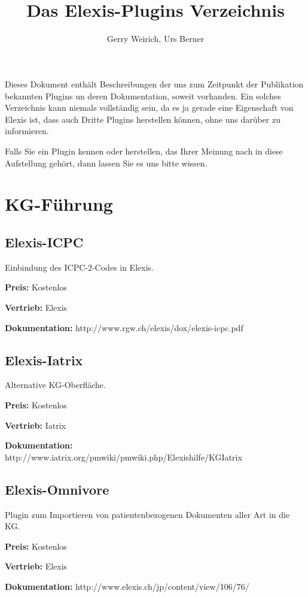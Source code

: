\documentclass[paper=a4,BCOR8.25mm]{scrartcl}
\author{Gerry Weirich, Urs Berner}
\title{Das Elexis\textsuperscript{\textregistered}-Plugins Verzeichnis}
\begin{document}
\maketitle

\tableofcontents


Dieses Dokument enthält Beschreibungen der uns zum Zeitpunkt der Publikation bekannten Plugins un deren Dokumentation, soweit vorhanden. Ein solches Verzeichnis kann niemals vollständig sein, da es ja gerade eine Eigenschaft von Elexis ist, dass auch Dritte Plugins herstellen können, ohne uns darüber zu informieren.

\medskip

Falls Sie ein Plugin kennen oder herstellen, das Ihrer Meinung nach in diese Aufstellung gehört, dann lassen Sie es uns bitte wissen.

\section{KG-Führung}
\subsection{Elexis-ICPC}
Einbindung des ICPC-2-Codes in Elexis. 

\medskip

\textbf{Preis:} Kostenlos

\textbf{Vertrieb:} Elexis

\textbf{Dokumentation:} http://www.rgw.ch/elexis/dox/elexis-icpc.pdf\

\subsection{Elexis-Iatrix}
Alternative KG-Oberfläche. 

\textbf{Preis:} Kostenlos

\textbf{Vertrieb:} Iatrix

\textbf{Dokumentation:} http://www.iatrix.org/pmwiki/pmwiki.php/Elexishilfe/KGIatrix

\subsection{Elexis-Omnivore}
Plugin zum Importieren von patientenbezogenen Dokumenten aller Art in die KG.

\textbf{Preis:} Kostenlos

\textbf{Vertrieb:} Elexis

\textbf{Dokumentation:} http://www.elexis.ch/jp/content/view/106/76/
\end{document}
